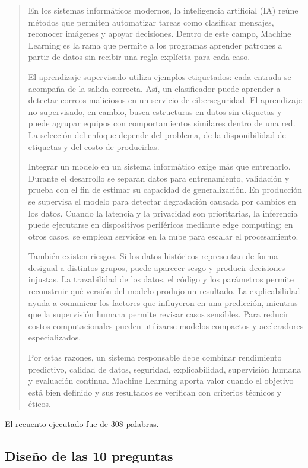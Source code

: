\documentclass[12pt,letterpaper]{article}
\begin{document}
\begin{quote}\small
En los sistemas informáticos modernos, la inteligencia artificial (IA) reúne
métodos que permiten automatizar tareas como clasificar mensajes, reconocer
imágenes y apoyar decisiones. Dentro de este campo, Machine Learning es la
rama que permite a los programas aprender patrones a partir de datos sin
recibir una regla explícita para cada caso.

El aprendizaje supervisado utiliza ejemplos etiquetados: cada entrada se
acompaña de la salida correcta. Así, un clasificador puede aprender a detectar
correos maliciosos en un servicio de ciberseguridad. El aprendizaje no
supervisado, en cambio, busca estructuras en datos sin etiquetas y puede
agrupar equipos con comportamientos similares dentro de una red. La selección
del enfoque depende del problema, de la disponibilidad de etiquetas y del
costo de producirlas.

Integrar un modelo en un sistema informático exige más que entrenarlo. Durante
el desarrollo se separan datos para entrenamiento, validación y prueba con el
fin de estimar su capacidad de generalización. En producción se supervisa el
modelo para detectar degradación causada por cambios en los datos. Cuando la
latencia y la privacidad son prioritarias, la inferencia puede ejecutarse en
dispositivos periféricos mediante edge computing; en otros casos, se emplean
servicios en la nube para escalar el procesamiento.

También existen riesgos. Si los datos históricos representan de forma desigual
a distintos grupos, puede aparecer sesgo y producir decisiones injustas. La
trazabilidad de los datos, el código y los parámetros permite reconstruir qué
versión del modelo produjo un resultado. La explicabilidad ayuda a comunicar
los factores que influyeron en una predicción, mientras que la supervisión
humana permite revisar casos sensibles. Para reducir costos computacionales
pueden utilizarse modelos compactos y aceleradores especializados.

Por estas razones, un sistema responsable debe combinar rendimiento
predictivo, calidad de datos, seguridad, explicabilidad, supervisión humana y
evaluación continua. Machine Learning aporta valor cuando el objetivo está
bien definido y sus resultados se verifican con criterios técnicos y éticos.
\end{quote}

El recuento ejecutado fue de 308 palabras.

\subsection{Diseño de las 10 preguntas}
\end{document}
